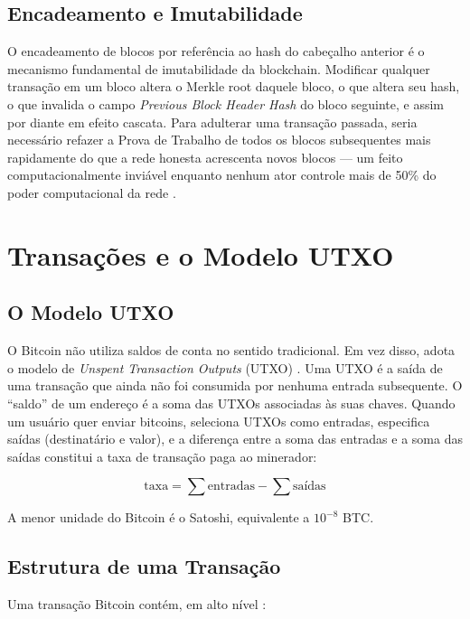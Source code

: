 \documentclass[12pt,a4paper]{report}
\begin{document}
\subsection{Encadeamento e Imutabilidade}

O encadeamento de blocos por referência ao hash do cabeçalho anterior é o mecanismo fundamental de imutabilidade da blockchain. Modificar qualquer transação em um bloco altera o Merkle root daquele bloco, o que altera seu hash, o que invalida o campo \textit{Previous Block Header Hash} do bloco seguinte, e assim por diante em efeito cascata. Para adulterar uma transação passada, seria necessário refazer a Prova de Trabalho de todos os blocos subsequentes mais rapidamente do que a rede honesta acrescenta novos blocos --- um feito computacionalmente inviável enquanto nenhum ator controle mais de 50\% do poder computacional da rede \cite{Bashir2023}.

\section{Transações e o Modelo UTXO}

\subsection{O Modelo UTXO}

O Bitcoin não utiliza saldos de conta no sentido tradicional. Em vez disso, adota o modelo de \textit{Unspent Transaction Outputs} (UTXO) \cite{Bashir2023}. Uma UTXO é a saída de uma transação que ainda não foi consumida por nenhuma entrada subsequente. O ``saldo'' de um endereço é a soma das UTXOs associadas às suas chaves. Quando um usuário quer enviar bitcoins, seleciona UTXOs como entradas, especifica saídas (destinatário e valor), e a diferença entre a soma das entradas e a soma das saídas constitui a taxa de transação paga ao minerador:

\[
\text{taxa} = \sum \text{entradas} - \sum \text{saídas}
\]

A menor unidade do Bitcoin é o Satoshi, equivalente a $10^{-8}$ BTC.

\subsection{Estrutura de uma Transação}

Uma transação Bitcoin contém, em alto nível \cite{Bashir2023}:
\end{document}
